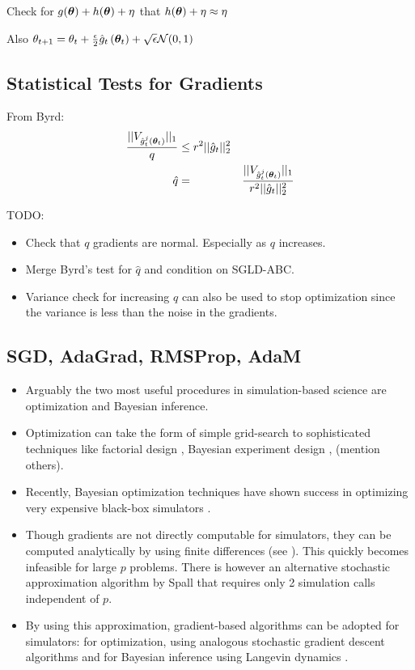 \documentclass[]{article}
\begin{document}
Check for $g(\thetav) + h(\thetav) + \eta$ that $h(\thetav) + \eta \approx \eta$

Also $\theta_{t+1} = \theta_t + \frac{\epsilon}{2}\gradestimate{t}{\thetav_t} + \sqrt{\epsilon}\mathcal{N}(0,1)$

\subsection{Statistical Tests for Gradients}

From Byrd:
\begin{eqnarray}
\frac{||V_{\gradestimaterepeat{t}{\thetav_t}{j}} ||_1}{q} & \leq r^2 || \hat{g}_t ||_2^2 \\
\hat{q} & = & \frac{||V_{\gradestimaterepeat{t}{\thetav_t}{j}} ||_1}{r^2 || \hat{g}_t ||_2^2}
\end{eqnarray}

TODO:
\begin{itemize}
  \item Check that $q$ gradients are normal.  Especially as $q$ increases.
  \item Merge Byrd's test for $\hat{q}$ and condition on SGLD-ABC.
  \item Variance check for increasing $q$ can also be used to stop optimization since the variance is less than the noise in the gradients.
\end{itemize}

\subsection{SGD, AdaGrad, RMSProp, AdaM}

\begin{itemize}
  \item  Arguably the two most useful procedures in simulation-based science are optimization and Bayesian inference.
  \item  Optimization can take the form of simple grid-search to sophisticated techniques like factorial design \cite{factorialdesign}, Bayesian experiment design \cite{bayesexpdesign}, (mention others).
  \item Recently, Bayesian optimization techniques have shown success in optimizing very expensive black-box simulators \cite{bosuccess}.
  \item Though gradients are not directly computable for simulators, they can be computed analytically by using finite differences (see \cite{kiefer1952}).  This quickly becomes infeasible for large $p$ problems.  There is however an alternative stochastic approximation algorithm by Spall \cite{spall1999} that requires only 2 simulation calls independent of $p$.
  \item By using this approximation, gradient-based algorithms can be adopted for simulators: for optimization, using analogous stochastic gradient descent algorithms and for Bayesian inference using Langevin dynamics \cite{langevin}.
\end{itemize}
\end{document}
